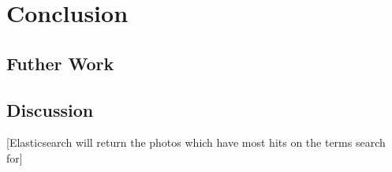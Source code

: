 \chapter{Conclusion}
\label{ch:conclusion}

\section{Futher Work}

\section{Discussion}
[Elasticsearch will return the photos which have most hits on the terms search for]
